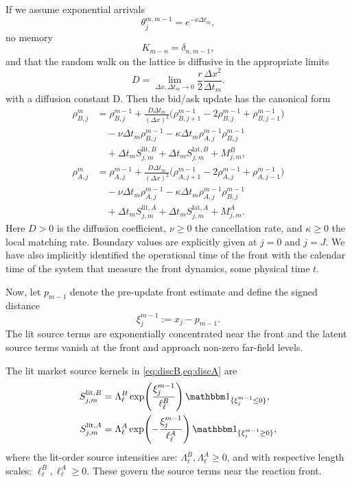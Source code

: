 \documentclass[5p,final]{elsarticle}
\begin{document}
If we assume exponential arrivals 
\begin{equation}
    \theta_j^{m,m-1} = e^{-\nu \Delta t_m},
\end{equation}
no memory 
\begin{equation}
    K_{m-n}=\delta_{n,m-1},
\end{equation} 
and that the random walk on the lattice is diffusive in the appropriate limits
\begin{equation}
    D =\lim_{\Delta x, \Delta t_m \to 0} \frac{r}{2}\frac{\Delta x^2}{\Delta t_m }.
\end{equation}
with a diffusion constant D. Then the bid/ask update has the canonical form 
\begin{align}
\rho_{B,j}^m
&= \rho_{B,j}^{m-1}
+ \frac{D\Delta t_m}{(\Delta x)^2}
\bigl(\rho_{B,j+1}^{m-1}-2\rho_{B,j}^{m-1}+\rho_{B,j-1}^{m-1}\bigr) \nonumber \\
&\quad - \nu\Delta t_m\rho_{B,j}^{m-1}
- \kappa\Delta t_m\rho_{A,j}^{m-1}\rho_{B,j}^{m-1}
\nonumber \\
&\quad + \Delta t_m S_{j,m}^{\mathrm{lit},B}
+ \Delta t_m S_{j,m}^{\mathrm{lat},B}
+ M_{j,m}^{B},
\label{eq:discB}
\\[1ex]
\rho_{A,j}^m
&= \rho_{A,j}^{m-1}
+ \frac{D\Delta t_m}{(\Delta x)^2}
\bigl(\rho_{A,j+1}^{m-1}-2\rho_{A,j}^{m-1}+\rho_{A,j-1}^{m-1}\bigr)
\nonumber\\
&\quad - \nu\Delta t_m\rho_{A,j}^{m-1}
 - \kappa\Delta t_m\rho_{A,j}^{m-1}\rho_{B,j}^{m-1}
\nonumber\\
&\quad
+ \Delta t_m S_{j,m}^{\mathrm{lit},A}
+ \Delta t_m S_{j,m}^{\mathrm{lat},A}
+ M_{j,m}^{A}.
\label{eq:discA}
\end{align}
Here $D>0$ is the diffusion coefficient, $\nu\ge 0$ the cancellation rate, and $\kappa\ge 0$ the local matching rate. Boundary values are explicitly given at $j=0$ and $j=J$. We have also implicitly identified the operational time of the front with the calendar time of the system that measure the front dynamics, some physical time $t$. 

Now, let $p_{m-1}$ denote the pre-update front estimate and define the signed distance
\begin{equation}
    \xi_j^{m-1}:=x_j-p_{m-1}.
\end{equation}
The lit source terms are exponentially concentrated near the front and the latent source terms vanish at the front and approach non-zero far-field levels.

The lit market source kernels in \cref{eq:discB,eq:discA} are
\begin{align}
S_{j,m}^{\mathrm{lit},B}
&=
\Lambda_\ell^B\exp\!\left(\frac{\xi_j^{m-1}}{\ell_\ell^B}\right)\mathbbm 1_{\{\xi_j^{m-1}\le 0\}},
\\
S_{j,m}^{\mathrm{lit},A}
&=
\Lambda_\ell^A\exp\!\left(-\frac{\xi_j^{m-1}}{\ell_\ell^A}\right)\mathbbm 1_{\{\xi_j^{m-1}\ge 0\}},
\end{align}
where the lit-order source intensities are: $\Lambda_\ell^B, \Lambda_\ell^A\ge 0$, and with respective length scales: $\ell_\ell^B,\ell_\ell^A \ge 0$. These govern the source terms near the reaction front. 
\end{document}
